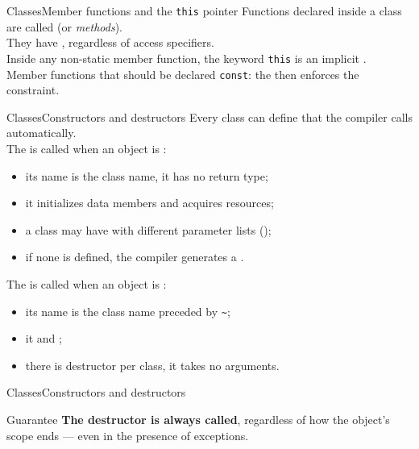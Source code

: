 \begin{frame}{Classes}{Member functions and the \texttt{this} pointer}
	\justifying
	Functions declared inside a class are called  (or \emph{methods}).\\
    They have , regardless of access specifiers.\\
	\bigskip
	Inside any non-static member function, the keyword \texttt{this} is an implicit .\\
	\bigskip
	Member functions that  should be declared \texttt{const}: the  then enforces the constraint.
\end{frame}
\begin{frame}{Classes}{Constructors and destructors}
	\justifying
	Every class can define  that the compiler calls automatically.\\
	\bigskip
	The  is called when an object is :
	\begin{itemize}
		\item its name is the class name, it has no return type;
		\item it initializes data members and acquires resources;
		\item a class may have  with different parameter lists ();
		\item if none is defined, the compiler generates a .
	\end{itemize}
	\bigskip
	The  is called when an object is :
	\begin{itemize}
		\item its name is the class name preceded by \texttt{\textasciitilde};
		\item it  and ;
		\item there is  destructor per class, it takes no arguments.
	\end{itemize}
\end{frame}
\begin{frame}{Classes}{Constructors and destructors}
	\begin{alertblock}{Guarantee}
		\justifying
		\textbf{The destructor is always called}, regardless of how the object's scope ends — even in the presence of exceptions.
	\end{alertblock}
\end{frame}
